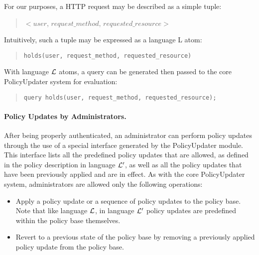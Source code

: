 \documentclass[11pt]{llncs}
\begin{document}
        For our purposes, a HTTP request may be described as a simple tuple:

        \begin{quote}
          $<$$user$, $request\_method$, $requested\_resource$$>$
        \end{quote}

        Intuitively, such a tuple may be expressed as a language {\cal L} atom:

        \begin{quote}
        \begin{verbatim}holds(user, request_method, requested_resource)\end{verbatim}
        \end{quote}

        With language ${\cal L}$ atoms, a query can be generated then passed to
        the core PolicyUpdater system for evaluation:

        \begin{quote}
          \begin{verbatim}query holds(user, request_method, requested_resource);\end{verbatim}
        \end{quote}

      \paragraph{\bf Policy Updates by Administrators.}

        After being properly authenticated, an administrator can perform policy
        updates through the use of a special interface generated by the
        PolicyUpdater module. This interface lists all the predefined policy
        updates that are allowed, as defined in the policy description in 
        language ${\cal L'}$, as well as all the policy updates that have been
        previously applied and are in effect. As with the core PolicyUpdater
        system, administrators are allowed only the following operations:

        \begin{itemize}
          \item
            Apply a policy update or a sequence of policy updates to the policy
            base. Note that like language ${\cal L}$, in language ${\cal L'}$
            policy updates are predefined within the policy base themselves.
          \vspace{1mm}
          \item
            Revert to a previous state of the policy base by removing a 
            previously applied policy update from the policy base. 
        \end{itemize}
\end{document}
